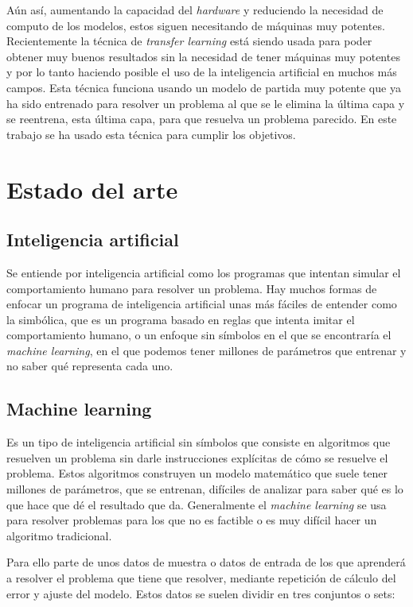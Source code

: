 \documentclass[12pt,a4paper]{article}
\begin{document}
Aún así, aumentando la capacidad del \textit{hardware} y reduciendo la necesidad de computo de los modelos, estos siguen necesitando de máquinas muy potentes. Recientemente la técnica de \textit{transfer learning} \cite{wiki:tl} está siendo usada para poder obtener muy buenos resultados sin la necesidad de tener máquinas muy potentes y por lo tanto haciendo posible el uso de la inteligencia artificial en muchos más campos. Esta técnica funciona usando un modelo de partida muy potente que ya ha sido entrenado para resolver un problema al que se le elimina la última capa y se reentrena, esta última capa, para que resuelva un problema parecido. En este trabajo se ha usado esta técnica para cumplir los objetivos.

\newpage
\section{Estado del arte}

\subsection{Inteligencia artificial}
Se entiende por inteligencia artificial \cite{wiki:ai} como los programas que intentan simular el comportamiento humano para resolver un problema. Hay muchos formas de enfocar un programa de inteligencia artificial unas más fáciles de entender como la simbólica, que es un programa basado en reglas que intenta imitar el comportamiento humano, o un enfoque sin símbolos en el que se encontraría el \textit{machine learning}, en el que podemos tener millones de parámetros que entrenar y no saber qué representa cada uno.

\subsection{Machine learning}
Es un tipo de inteligencia artificial sin símbolos que consiste en algoritmos \cite{wiki:ml} que resuelven un problema sin darle instrucciones explícitas de cómo se resuelve el problema. Estos algoritmos construyen un modelo matemático que suele tener millones de parámetros, que se entrenan, difíciles de analizar para saber qué es lo que hace que dé el resultado que da. Generalmente el \textit{machine learning} se usa para resolver problemas para los que no es factible o es muy difícil hacer un algoritmo tradicional.
\bigskip

Para ello parte de unos datos de muestra o datos de entrada de los que aprenderá a resolver el problema que tiene que resolver, mediante repetición de cálculo del error y ajuste del modelo. Estos datos se suelen dividir en tres conjuntos o sets:
\end{document}

